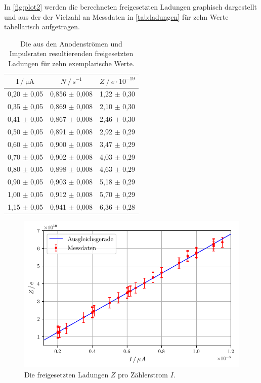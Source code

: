 In \autoref{fig:plot2} werden die berechneten freigesetzten Ladungen graphisch dargestellt und
aus der der Vielzahl an Messdaten in \autoref{tab:ladungen} für zehn Werte tabellarisch aufgetragen.
\begin{table}
    \centering
    \caption{Die aus den Anodenströmen und Impulsraten resultierenden freigesetzten Ladungen für zehn exemplarische Werte.}
    \label{tab:ladungen}
    \begin{tabular}{c c c}
        \toprule
        $\mathrm{I} \mathbin{/} \unit{\micro\ampere}$ &
        $N \mathbin{/} \mathrm{s^{-1}}$ &
        $Z \mathbin{/} e \cdot 10^{-19}$ \\
        \midrule
        0,20 $\pm$ 0,05 & 0,856 $\pm$ 0,008 & 1,22 $\pm$ 0,30 \\
        0,35 $\pm$ 0,05 & 0,869 $\pm$ 0,008 & 2,10 $\pm$ 0,30 \\
        0,41 $\pm$ 0,05 & 0,867 $\pm$ 0,008 & 2,46 $\pm$ 0,30 \\
        0,50 $\pm$ 0,05 & 0,891 $\pm$ 0,008 & 2,92 $\pm$ 0,29 \\
        0,60 $\pm$ 0,05 & 0,900 $\pm$ 0,008 & 3,47 $\pm$ 0,29 \\
        0,70 $\pm$ 0,05 & 0,902 $\pm$ 0,008 & 4,03 $\pm$ 0,29 \\
        0,80 $\pm$ 0,05 & 0,898 $\pm$ 0,008 & 4,63 $\pm$ 0,29 \\
        0,90 $\pm$ 0,05 & 0,903 $\pm$ 0,008 & 5,18 $\pm$ 0,29 \\
        1,00 $\pm$ 0,05 & 0,912 $\pm$ 0,008 & 5,70 $\pm$ 0,29 \\
        1,15 $\pm$ 0,05 & 0,941 $\pm$ 0,008 & 6,36 $\pm$ 0,28 \\
        \bottomrule
    \end{tabular}
\end{table}

\begin{figure}
    \centering
    \includegraphics[width = 0.9\linewidth]{build/plot2.pdf}
    \caption{Die freigesetzten Ladungen $Z$ pro Zählerstrom $I$.}
    \label{fig:plot2}
\end{figure}